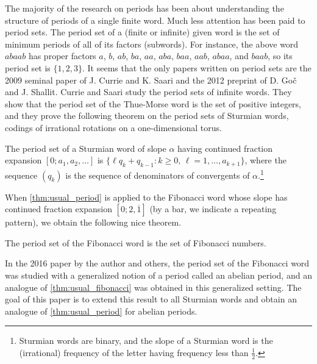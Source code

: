\documentclass[a4paper,fleqn]{article}
\begin{document}
  The majority of the research on periods has been about understanding the structure of periods of a single finite
  word. Much less attention has been paid to period sets. The period set of a (finite or infinite) given word is the
  set of minimum periods of all of its factors (subwords). For instance, the above word $abaab$ has proper factors $a$,
  $b$, $ab$, $ba$, $aa$, $aba$, $baa$, $aab$, $abaa$, and $baab$, so its period set is $\{1, 2, 3\}$. It seems that the
  only papers written on period sets are the 2009 seminal paper
  \cite{2009:least_periods_of_factors_of_infinite_words} of J. Currie and K. Saari and the 2012 preprint
  \cite{2012:least_periods_of_k-automatic_sequences} of D. Go{\v c} and J. Shallit. Currie and Saari study the period
  sets of infinite words. They show that the period set of the Thue-Morse word
  \cite{1999:the_ubiquitous_prouhet-thue-morse_sequence} is the set of positive integers, and they prove the following
  theorem on the period sets of Sturmian words, codings of irrational rotations on a one-dimensional torus.

  \begin{theorem}\label{thm:usual_period}\cite[Cor.~3]{2009:least_periods_of_factors_of_infinite_words}
    The period set of a Sturmian word of slope $\alpha$ having continued fraction expansion $[0; a_1, a_2, \ldots]$ is
    $\{\ell q_k + q_{k-1} : \text{$k \geq 0$, $\ell = 1, \ldots, a_{k+1}$}\}$, where the sequence $(q_k)$ is the
    sequence of denominators of convergents of $\alpha$.\footnote{Sturmian words are binary, and the slope of a Sturmian word is the (irrational) frequency of the letter having frequency less than $\tfrac12$.}
  \end{theorem}

  When \autoref{thm:usual_period} is applied to the Fibonacci word whose slope has continued fraction expansion
  $[0; 2, \overline{1}]$ (by a bar, we indicate a repeating pattern), we obtain the following nice theorem.

  \begin{theorem}\label{thm:usual_fibonacci}\cite[Cor.~4]{2009:least_periods_of_factors_of_infinite_words}
    The period set of the Fibonacci word is the set of Fibonacci numbers.
  \end{theorem}

  In the 2016 paper \cite{2016:abelian_powers_and_repetitions_in_sturmian_words} by the author and others, the period
  set of the Fibonacci word was studied with a generalized notion of a period called an abelian period, and an analogue
  of \autoref{thm:usual_fibonacci} was obtained in this generalized setting. The goal of this paper is to extend this
  result to all Sturmian words and obtain an analogue of \autoref{thm:usual_period} for abelian periods.
\end{document}
